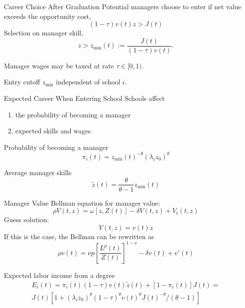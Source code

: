\documentclass[
  ignorenonframetext,
  aspectratio=1610,
]{beamer}
\providecommand{\tightlist}{%
  \setlength{\itemsep}{0pt}\setlength{\parskip}{0pt}}
\begin{document}
\begin{frame}{Career Choice After Graduation}
\protect\hypertarget{career-choice-after-graduation}{}
Potential managers choose to enter if net value exceeds the opportunity
cost, \[(1-\tau)v(t)z > J(t)\] Selection on manager skill,
\[z > z_{\min}(t) := \frac {J(t)} {(1-\tau)v(t)}.\]

Manager wages may be taxed at rate \(\tau\in[0,1)\).

Entry cutoff \(z_{\min}\) independent of school \(i\).
\end{frame}

\begin{frame}{Expected Career When Entering School}
\protect\hypertarget{expected-career-when-entering-school}{}
Schools affect

\begin{enumerate}
\tightlist
\item
  the probability of becoming a manager
\item
  expected skills and wages
\end{enumerate}
\end{frame}

\begin{frame}{Probability of becoming a manager}
\protect\hypertarget{probability-of-becoming-a-manager}{}
\[
\pi_i(t) = 
    z_{\min}(t)^{-\theta}
        (\lambda_i z_0)^{\theta}
\]
\end{frame}

\begin{frame}{Average manager skills}
\protect\hypertarget{average-manager-skills}{}
\[\tilde z(t) = \frac {\theta}{\theta-1} z_{\min}(t) \]
\end{frame}

\begin{frame}{Manager Value}
\protect\hypertarget{manager-value}{}
Bellman equation for manager value:
\[\rho V(t,z) = \omega[z,Z(t)] - \delta V(t,z) + V_t(t,z)\] Guess
solution: \[V(t,z) = v(t)z\] If this is the case, the Bellman can be
rewritten as
\[\rho v(t) = \nu p \left[\frac {L^{p}(t)}{Z(t)}\right]^{1-\nu} - \delta v(t) + v'(t)\]
\end{frame}

\begin{frame}{Expected labor income from a degree}
\protect\hypertarget{expected-labor-income-from-a-degree}{}
\begin{multline*}
E_i(t) = 
\pi_i(t)(1-\tau) v(t) \tilde z(t) + [1-\pi_i(t)] J(t) = \\
J(t) \left[
1 + (\lambda_i z_0)^\theta (1-\tau)^{\theta} v(t)^\theta J(t)^{-\theta}/(\theta-1)
\right]
\end{multline*}
\end{frame}
\end{document}

